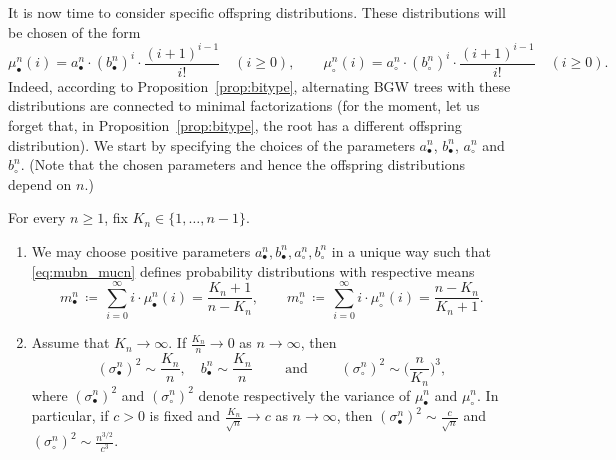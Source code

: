 \documentclass[AHL,XML,longabstracts,Unicode]{cedram}
\def\abn{a_{\bullet}^{n}}
\def\acn{a_{\circ}^{n}}
\def\bbn{b_{\bullet}^{n}}
\def\bcn{b_{\circ}^{n}}
\def\mubn{\mu_{\bullet}^{n}}
\def\mucn{\mu_{\circ}^{n}}
\def\scn{\sigma_{\circ}^{n}}
\def\sbn{\sigma_{\bullet}^{n}}
\begin{document}
It is now time to consider specific offspring distributions.
These distributions will be chosen of the form
\begin{equation}
  \mubn(i)= \abn \cdot  (\bbn)^{i} \cdot \frac{(i+1)^{i-1}}{i!}  \quad (i \geq 0), \qquad \mucn(i)= \acn \cdot  (\bcn)^{i} \cdot \frac{(i+1)^{i-1}}{i!}  \quad (i \geq 0).
  \label{eq:mubn_mucn}
\end{equation}
Indeed, according to Proposition~\ref{prop:bitype},
alternating BGW trees with these distributions are connected to minimal factorizations
(for the moment, let us forget that, in Proposition~\ref{prop:bitype}, the root has a different offspring distribution).
We start by specifying the choices of the parameters
$\abn$, $\bbn$, $\acn$ and $\bcn$.
(Note that the chosen parameters and hence the offspring distributions depend on $n$.)

\begin{lemma}\label{lem:exist} For every $n \ge 1$,  fix $K_{n} \in \{1,\dots,n-1\}$.
\begin{enumerate}
  \item[(i)] We may choose positive parameters  $\abn,\bbn,\acn,\bcn$ in a unique way  such that \eqref{eq:mubn_mucn}
defines probability distributions with respective means
\[m^{n}_{\bullet}  \, \coloneqq  \, \sum_{i=0}^{\infty} i \cdot \mubn(i)= \frac{K_{n}+1}{n-K_{n}}, \qquad m^{n}_{\circ} \, \coloneqq \, \sum_{i=0}^{\infty} i \cdot \mucn(i)= \frac{n-K_{n}}{K_{n}+1}.\]
\item[(ii)] Assume that $K_{n} \rightarrow \infty$. If $\tfrac{K_{n}}{n} \rightarrow 0$ as $n \rightarrow \infty$, then
\[(\sbn)^{2} \sim \frac{K_{n}}{n}, \quad  \bbn \sim \frac{K_{n}}{n}  \qquad \text{ and } \qquad  (\scn)^{2} \sim   \big( \frac{n}{K_{n}} \big)^{3},\]
where $(\sbn)^{2}$ and $(\scn)^{2}$ denote respectively the variance of $\mubn$ and $\mucn$.
In particular, if $c>0$ is fixed and $\tfrac{K_{n}}{\sqrt{n}} \rightarrow c$ as $n \rightarrow \infty$, then   $ (\sbn)^{2} \sim \tfrac{c}{\sqrt{n}}$ and $(\scn)^{2} \sim  \frac{n^{3/2}}{c^{3}}$.
\end{enumerate}
\end{lemma}
\end{document}
